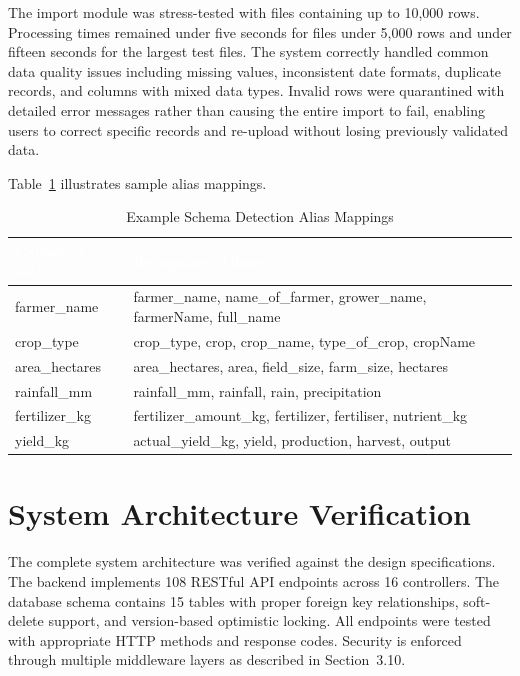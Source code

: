 \documentclass[12pt,a4paper,oneside]{report}
\begin{document}
The import module was stress-tested with files containing up to 10,000 rows. Processing times remained under five seconds for files under 5,000 rows and under fifteen seconds for the largest test files. The system correctly handled common data quality issues including missing values, inconsistent date formats, duplicate records, and columns with mixed data types. Invalid rows were quarantined with detailed error messages rather than causing the entire import to fail, enabling users to correct specific records and re-upload without losing previously validated data.

Table~\ref{tab:import-aliases} illustrates sample alias mappings.

\begin{table}[H]
\centering
\caption{Example Schema Detection Alias Mappings}
\label{tab:import-aliases}
\renewcommand{\arraystretch}{1.4}
\begin{tabularx}{\textwidth}{XX}
\toprule
\rowcolor{headerblue}
\textcolor{white}{\textbf{Canonical Field}} & \textcolor{white}{\textbf{Recognized Aliases}} \\
\midrule
farmer\_name & farmer\_name, name\_of\_farmer, grower\_name, farmerName, full\_name \\
\rowcolor{rowalt}
crop\_type & crop\_type, crop, crop\_name, type\_of\_crop, cropName \\
area\_hectares & area\_hectares, area, field\_size, farm\_size, hectares \\
\rowcolor{rowalt}
rainfall\_mm & rainfall\_mm, rainfall, rain, precipitation \\
fertilizer\_kg & fertilizer\_amount\_kg, fertilizer, fertiliser, nutrient\_kg \\
\rowcolor{rowalt}
yield\_kg & actual\_yield\_kg, yield, production, harvest, output \\
\bottomrule
\end{tabularx}
\end{table}

\section{System Architecture Verification}
The complete system architecture was verified against the design specifications. The backend implements 108 RESTful API endpoints across 16 controllers. The database schema contains 15 tables with proper foreign key relationships, soft-delete support, and version-based optimistic locking. All endpoints were tested with appropriate HTTP methods and response codes. Security is enforced through multiple middleware layers as described in Section~3.10.
\end{document}
